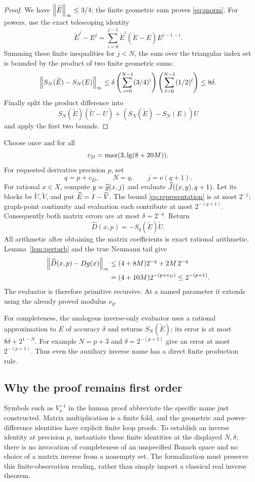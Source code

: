 \begin{proof}
We have \(\left\lVert\widetilde E\right\rVert_\infty\le3/4\); the finite geometric
sum proves \eqref{eq:snorm}. For powers, use the exact telescoping
identity
\[
 \widetilde E^j-E^j
 =\sum_{i=0}^{j-1}
   \widetilde E^i(\widetilde E-E)E^{j-1-i}.
\]
Summing these finite inequalities for \(j<N\), the sum over the
triangular index set is bounded by the product of two finite
geometric sums:
\[
 \left\lVert S_N(\widetilde E)-S_N(E)\right\rVert_\infty
 \le \delta
  \left(\sum_{i=0}^{N-1}(3/4)^i\right)
  \left(\sum_{l=0}^{N-1}(1/2)^l\right)
 \le8\delta.
\]
Finally split the product difference into
\[
 S_N(\widetilde E)(\widetilde U-U)
 +(S_N(\widetilde E)-S_N(E))U
\]
and apply the first two bounds.
\end{proof}

Choose once and for all
\[
 c_D=\max(3,\operatorname{lg}(8+20M)).
\]
For requested derivative precision \(p\), set
\[
 q=p+c_D,\qquad N=q,\qquad j=\nu(q+1).
\]
For rational \(x\in X\), compute \(y=\widehat g(x,j)\) and evaluate
\(\widehat J((x,y),q+1)\). Let its blocks be
\(\widetilde U,\widetilde V\), and put
\(\widetilde E=I-\widetilde V\). The bound
\eqref{eq:representation} is at most \(2^{-j}\); graph-point
continuity and evaluation each contribute at most \(2^{-(q+1)}\).
Consequently both matrix errors are at most
\(\delta=2^{-q}\). Return
\begin{equation}\label{eq:derivativeprogram}
 \widehat D(x,p)
   =-S_q(\widetilde E)\widetilde U.
\end{equation}
All arithmetic after obtaining the matrix coefficients is exact
rational arithmetic. Lemma~\ref{lem:perturb} and the true
Neumann tail give
\begin{align*}
 \left\lVert\widehat D(x,p)-Dg(x)\right\rVert_\infty
 &\le(4+8M)2^{-q}+2M\,2^{-q}\\
 &=(4+10M)2^{-(p+c_D)}
 \le2^{-(p+1)}.
\end{align*}
The evaluator is therefore primitive recursive. At a named
parameter it extends using the already proved modulus \(\nu_g\).

For completeness, the analogous inverse-only evaluator uses a
rational approximation to \(E\) of accuracy \(\delta\) and returns
\(S_N(\widetilde E)\); its error is at most
\(8\delta+2^{1-N}\). For example \(N=p+3\) and
\(\delta=2^{-(p+5)}\) give an error at most \(2^{-(p+1)}\).
Thus even the auxiliary inverse name has a direct finite
production rule.

\subsection{Why the proof remains first order}

Symbols such as \(V_x^{-1}\) in the human proof abbreviate the
specific name just constructed. Matrix multiplication is a finite
fold, and the geometric and power-difference identities have
explicit finite loop proofs. To establish an inverse identity at
precision \(p\), instantiate these finite identities at the
displayed \(N,\delta\); there is no invocation of completeness of
an unspecified Banach space and no choice of a matrix inverse
from a nonempty set. The formalization must preserve this
finite-observation reading, rather than simply import a classical
real inverse theorem.
